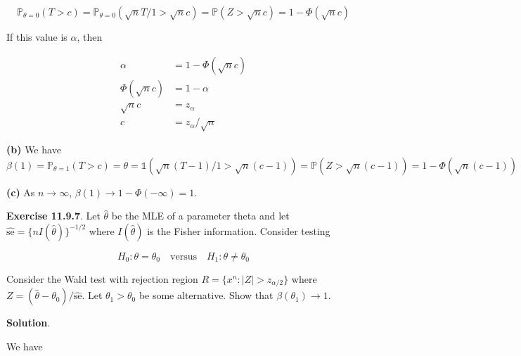 \[\mathbb{P}_{\theta = 0}(T > c) = \mathbb{P}_{\theta = 0}(\sqrt{n}T / 1 > \sqrt{n}c) = \mathbb{P}(Z > \sqrt{n} c) = 1 - \Phi(\sqrt{n}c)\]

If this value is \(\alpha\), then

\begin{align*}
\alpha &= 1 - \Phi(\sqrt{n}c) \\
\Phi(\sqrt{n}c) &= 1 - \alpha \\
\sqrt{n}c &= z_{\alpha} \\
c &= z_{\alpha} / \sqrt{n}
\end{align*}

\textbf{(b)} We have
\(\beta(1) = \mathbb{P}_{\theta = 1}(T > c) = \mathbb{\theta = 1}(\sqrt{n}(T - 1)/1 > \sqrt{n}(c - 1)) = \mathbb{P}(Z > \sqrt{n}(c - 1)) = 1 - \Phi(\sqrt{n}(c - 1)) = 1 - \Phi(z_\alpha - \sqrt{n})\)

\textbf{(c)} As \(n \rightarrow \infty\),
\(\beta(1) \rightarrow 1 - \Phi(-\infty) = 1\).

\textbf{Exercise 11.9.7}. Let \(\hat{\theta}\) be the MLE of a parameter
theta and let \(\hat{\text{se}} = \{ n I(\hat{\theta})\}^{-1/2}\) where
\(I(\hat{\theta})\) is the Fisher information. Consider testing

\[H_{0}: \theta = \theta_{0} \quad \text{versus} \quad H_{1}: \theta \neq \theta_{0}\]

Consider the Wald test with rejection region
\(R = \{ x^{n}: |Z| > z_{\alpha/2} \}\) where
\(Z = (\hat{\theta} - \theta_{0}) / \hat{\text{se}}\). Let
\(\theta_{1} > \theta_{0}\) be some alternative. Show that
\(\beta(\theta_{1}) \rightarrow 1\).

\textbf{Solution}.

We have

